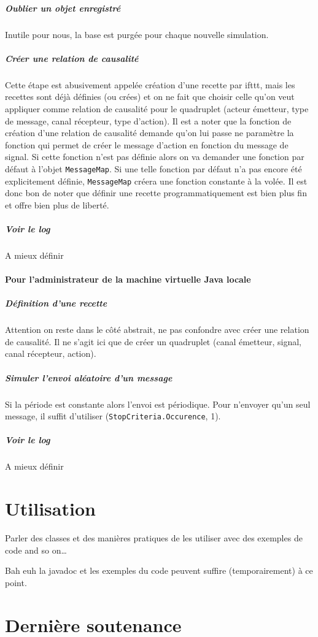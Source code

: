 \documentclass[11pt]{article}
\begin{document}
\subparagraph{Oublier un objet enregistré} Inutile pour nous, la base est purgée pour chaque nouvelle simulation.

\subparagraph{Créer une relation de causalité} Cette étape est abusivement appelée création d'une recette par ifttt, mais les recettes sont déjà définies (ou crées) et on ne fait que choisir celle qu'on veut appliquer comme relation de causalité pour le quadruplet (acteur émetteur, type de message, canal récepteur, type d'action). Il est a noter que la fonction de création d'une relation de causalité demande qu'on lui passe ne paramètre la fonction qui permet de créer le message d'action en fonction du message de signal. Si cette fonction n'est pas définie alors on va demander une fonction par défaut à l'objet \texttt{MessageMap}. Si une telle fonction par défaut n'a pas encore été explicitement définie, \texttt{MessageMap} créera une fonction constante à la volée. Il est donc bon de noter que définir une recette programmatiquement est bien plus fin et offre bien plus de liberté.

\subparagraph{Voir le log} A mieux définir

\paragraph{Pour l'administrateur de la machine virtuelle Java locale}

\subparagraph{Définition d'une recette} Attention on reste dans le côté abstrait, ne pas confondre avec créer une relation de causalité. Il ne s'agit ici que de créer un quadruplet (canal émetteur, signal, canal récepteur, action).

\subparagraph{Simuler l'envoi aléatoire d'un message} Si la période est constante alors l'envoi est périodique. Pour n'envoyer qu'un seul message, il suffit d'utiliser (\texttt{StopCriteria.Occurence}, 1).

\subparagraph{Voir le log} A mieux définir

\section{Utilisation}

Parler des classes et des manières \og pratiques \fg{} de les utiliser avec des exemples de code and so on\dots

Bah euh la javadoc et les exemples du code peuvent suffire (temporairement) à ce point.

\section{Dernière soutenance}
\end{document}
